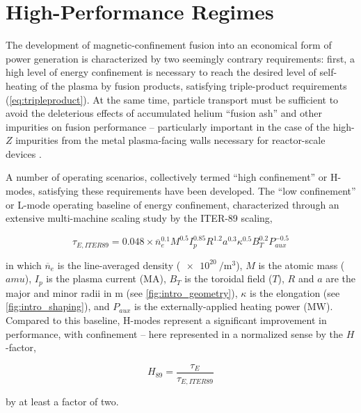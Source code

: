 \chapter{High-Performance Regimes}\label{ch:HighPerformance}

The development of magnetic-confinement fusion into an economical form of power generation is characterized by two seemingly contrary requirements: first, a high level of energy confinement is necessary to reach the desired level of self-heating of the plasma by fusion products, satisfying triple-product requirements (\cref{eq:tripleproduct}).  At the same time, particle transport must be sufficient to avoid the deleterious effects of accumulated helium ``fusion ash'' and other impurities on fusion performance -- particularly important in the case of the high-$Z$ impurities from the metal plasma-facing walls necessary for reactor-scale devices \cite{Loarte2007}.

A number of operating scenarios, collectively termed ``high confinement'' or H-modes\cite{Wagner1982}, satisfying these requirements have been developed.  The ``low confinement'' or L-mode operating baseline of energy confinement, characterized through an extensive multi-machine scaling study \cite{Yushmanov1990} by the ITER-89 scaling,

\begin{equation}\label{eq:tau89}
 \tau_{E,ITER89} = 0.048 \times \overline{n}_e^{0.1} M^{0.5} I_p^{0.85} R^{1.2} a^{0.3} \kappa^{0.5} B_T^{0.2} P_{aux}^{-0.5}
\end{equation}

\noindent in which $\overline{n}_e$ is the line-averaged density ($\SI{e20}{\per\meter\cubed}$), $M$ is the atomic mass ($\si{amu}$), $I_p$ is the plasma current ($\si{\mega\ampere}$), $B_T$ is the toroidal field ($\si{T}$), $R$ and $a$ are the major and minor radii in $\si{\meter}$ (see \cref{fig:intro_geometry}), $\kappa$ is the elongation (see \cref{fig:intro_shaping}), and $P_{aux}$ is the externally-applied heating power ($\si{\mega\watt}$).  Compared to this baseline, H-modes represent a significant improvement in performance, with confinement -- here represented in a normalized sense by the $H$-factor, \ie

\begin{equation}\label{eq:H89}
 H_{89} = \frac{\tau_E}{\tau_{E,ITER89}}
\end{equation}

\noindent by at least a factor of two.

